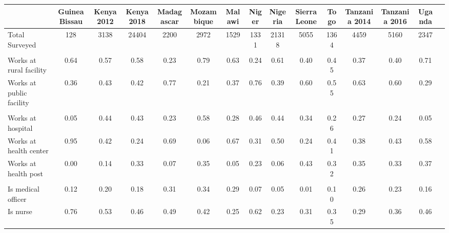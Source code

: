 \def\sym#1{\ifmmode^{#1}\else\(^{#1}\)\fi}
\begin{tabular}{l*{14}{c}}
\hline\hline
&\multicolumn{1}{c}{Guinea Bissau}&\multicolumn{1}{c}{Kenya 2012}&\multicolumn{1}{c}{Kenya 2018}&\multicolumn{1}{c}{Madagascar}&\multicolumn{1}{c}{Mozambique}&\multicolumn{1}{c}{Malawi}&\multicolumn{1}{c}{Niger}&\multicolumn{1}{c}{Nigeria}&\multicolumn{1}{c}{Sierra Leone}&\multicolumn{1}{c}{Togo}&\multicolumn{1}{c}{Tanzania 2014}&\multicolumn{1}{c}{Tanzania 2016}&\multicolumn{1}{c}{Uganda}&\\
\hline
Total Surveyed&                        {128}&        {3138}&  {24404}&      {2200}&        {2972}&        {1529}&        {1331}&        {21318}&        {5055}&        {1364}&       {4459}&       {5160}&       {2347}\\
  &  {}\\
Works at rural facility&       {0.64}&        {0.57}&  {0.58}&  {0.23}&    {0.79}&        {0.63}&        {0.24}&        {0.61}&        {0.40}&        {0.45}&       {0.37}&       {0.40}&       {0.71}\\
Works at public facility&  {0.36}&    {0.43}&  {0.42}&  {0.77}&    {0.21}&        {0.37}&        {0.76}&        {0.39}&        {0.60}&        {0.55}&       {0.63}&       {0.60}&       {0.29}\\
 &   {}\\
Works at hospital&             {0.05}&        {0.44}&  {0.43}&  {0.23}&    {0.58}&        {0.28}&        {0.46}&        {0.44}&        {0.34}&        {0.26}&       {0.27}&       {0.24}&       {0.05}\\
Works at health center&        {0.95}&        {0.42}&  {0.24}&      {0.69}&        {0.06}&        {0.67}&        {0.31}&        {0.50}&        {0.24}&        {0.41}&       {0.38}&       {0.43}&       {0.58}\\
Works at health post&          {0.00}&        {0.14}&  {0.33}&  {0.07}&    {0.35}&        {0.05}&        {0.23}&        {0.06}&        {0.43}&        {0.32}&       {0.35}&       {0.33}&       {0.37}\\
 &   {}\\
Is medical officer&            {0.12}&        {0.20}&  {0.18}&  {0.31}&    {0.34}&        {0.29}&        {0.07}&        {0.05}&        {0.01}&        {0.10}&       {0.26}&       {0.23}&       {0.16}\\
Is nurse&                              {0.76}&        {0.53}&  {0.46}&  {0.49}&    {0.42}&        {0.25}&        {0.62}&        {0.23}&        {0.31}&        {0.35}&       {0.29}&       {0.36}&       {0.46}\\

\end{tabular}
